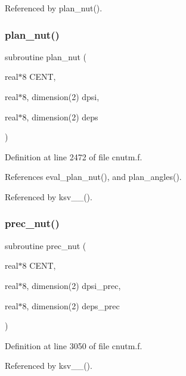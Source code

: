 Referenced by plan\+\_\+nut().

\mbox{\label{cnutm_8f_aba925b3b46e47b2fba6a156e2e0a3f7b}} 
\subsubsection{\texorpdfstring{plan\+\_\+nut()}{plan\_nut()}}
{\footnotesize\ttfamily subroutine plan\+\_\+nut (\begin{DoxyParamCaption}\item[{real$\ast$8}]{C\+E\+NT,  }\item[{real$\ast$8, dimension(2)}]{dpsi,  }\item[{real$\ast$8, dimension(2)}]{deps }\end{DoxyParamCaption})}



Definition at line 2472 of file cnutm.\+f.



References eval\+\_\+plan\+\_\+nut(), and plan\+\_\+angles().



Referenced by ksv\+\_\+\_().

\mbox{\label{cnutm_8f_a7ffa7e081dadaf0ed066f4a2776b47bb}} 
\subsubsection{\texorpdfstring{prec\+\_\+nut()}{prec\_nut()}}
{\footnotesize\ttfamily subroutine prec\+\_\+nut (\begin{DoxyParamCaption}\item[{real$\ast$8}]{C\+E\+NT,  }\item[{real$\ast$8, dimension(2)}]{dpsi\+\_\+prec,  }\item[{real$\ast$8, dimension(2)}]{deps\+\_\+prec }\end{DoxyParamCaption})}



Definition at line 3050 of file cnutm.\+f.



Referenced by ksv\+\_\+\_().

